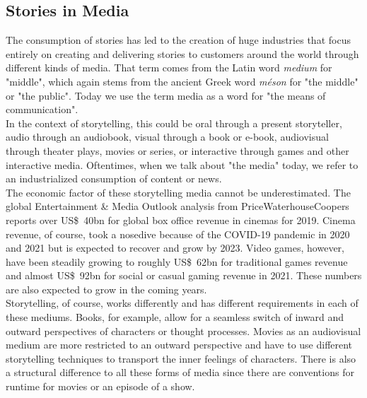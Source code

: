 \subsection{Stories in Media}
The consumption of stories has led to the creation of huge industries that focus entirely on creating and delivering stories to customers around the world through different kinds of media. That term comes from the Latin word \textit{medium} for "middle", which again stems from the ancient Greek word \textit{méson} for "the middle" or "the public". Today we use the term media as a word for "the means of communication".~\cite{Hoffmann2000}\\
In the context of storytelling, this could be oral through a present storyteller, audio through an audiobook, visual through a book or e-book, audiovisual through theater plays, movies or series, or interactive through games and other interactive media. Oftentimes, when we talk about "the media" today, we refer to an industrialized consumption of content or news.\\
The economic factor of these storytelling media cannot be underestimated. The global Entertainment \& Media Outlook analysis from PriceWaterhouseCoopers reports over US\$~40bn for global box office revenue in cinemas for 2019. Cinema revenue, of course, took a nosedive because of the COVID-19 pandemic in 2020 and 2021 but is expected to recover and grow by 2023. Video games, however, have been steadily growing to roughly US\$~62bn for traditional games revenue and almost US\$~92bn for social or casual gaming revenue in 2021. These numbers are also expected to grow in the coming years.~\cite{PwC2021}\\
Storytelling, of course, works differently and has different requirements in each of these mediums. Books, for example, allow for a seamless switch of inward and outward perspectives of characters or thought processes. Movies as an audiovisual medium are more restricted to an outward perspective and have to use different storytelling techniques to transport the inner feelings of characters. There is also a structural difference to all these forms of media since there are conventions for runtime for movies or an episode of a  show.~\cite{Ryan2004}\\
